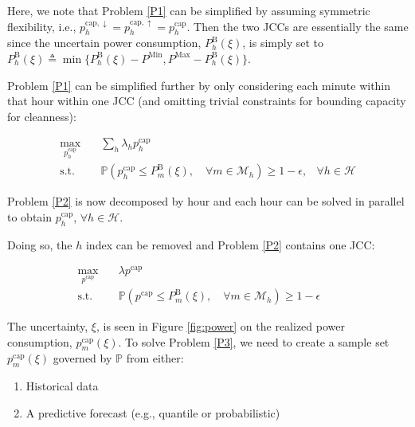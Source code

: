 \documentclass{report}
\begin{document}
Here, we note that Problem \ref{P1} can be simplified by assuming symmetric flexibility, i.e., $p_{h}^{\text{cap},\downarrow} = p_{h}^{\text{cap},\uparrow} = p_{h}^{\text{cap}}$. Then the two JCCs are essentially the same since the uncertain power consumption, $P_{h}^{\text{B}}(\xi)$, is simply set to $P_{h}^{\text{B}}(\xi) \triangleq \min \{ P_{h}^{\text{B}}(\xi) - P^{\text{Min}}, P^{\text{Max}} - P_{h}^{\text{B}}(\xi) \}$.

Problem \ref{P1} can be simplified further by only considering each minute within that hour within one JCC (and omitting trivial constraints for bounding capacity for cleanness):

\begin{align}\label{P2}
    \max_{p_{h}^{\text{cap}}} \quad & \sum_h \lambda_h p_{h}^{\text{cap}}                                                                                                                             \\
    \text{s.t.} \quad               & \mathbb{P}  \left( p_{h}^{\text{cap}} \leq P_{m}^{\text{B}}(\xi), \quad \forall{m} \in \mathcal{M}_{h}  \right) \geq 1 - \epsilon, & \forall{h} \in \mathcal{H}
\end{align}

Problem \ref{P2} is now decomposed by hour and each hour can be solved in parallel to obtain $p_{h}^{\text{cap}}$, $\forall{h} \in \mathcal{H}$.

Doing so, the $h$ index can be removed and Problem \ref{P2} contains one JCC:

\begin{align}\label{P3}
    \max_{p^{\text{cap}}} \quad & \lambda p^{\text{cap}}                                                                                                             \\
    \text{s.t.} \quad           & \mathbb{P}  \left( p^{\text{cap}} \leq P_{m}^{\text{B}}(\xi), \quad \forall{m} \in \mathcal{M}_{h}  \right) \geq 1 - \epsilon &  &
\end{align}

The uncertainty, $\xi$, is seen in Figure \ref{fig:power} on the realized power consumption, $p_{m}^{\text{cap}}(\xi)$. To solve Problem \ref{P3}, we need to create a sample set  $p_{m}^{\text{cap}}(\xi)$ governed by $\mathbb{P}$ from either:

\begin{enumerate}
    \item Historical data
    \item A predictive forecast (e.g., quantile or probabilistic)
\end{enumerate}
\end{document}
